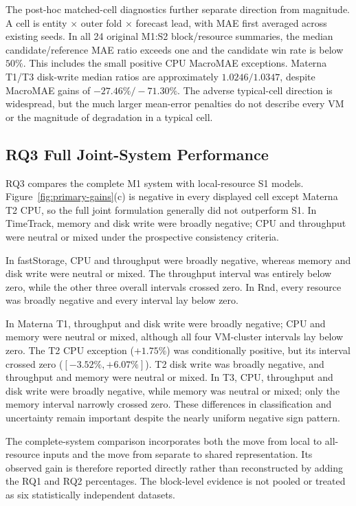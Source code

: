 \documentclass[a4paper,fleqn]{cas-dc}
\begin{document}
The post-hoc matched-cell diagnostics further separate direction from
magnitude. A cell is entity $\times$ outer fold $\times$ forecast lead, with
MAE first averaged across existing seeds. In all 24 original M1:S2
block/resource summaries, the median candidate/reference MAE ratio exceeds
one and the candidate win rate is below $50\%$. This includes the small
positive CPU MacroMAE exceptions. Materna T1/T3 disk-write median ratios are
approximately $1.0246/1.0347$, despite MacroMAE gains of
$-27.46\%/-71.30\%$. The adverse typical-cell direction is widespread, but
the much larger mean-error penalties do not describe every VM or the
magnitude of degradation in a typical cell.



\subsection{RQ3 Full Joint-System Performance}
\label{sec:results-rq3}

RQ3 compares the complete M1 system with local-resource S1 models.
Figure~\ref{fig:primary-gains}(c) is negative in every displayed cell except
Materna T2 CPU, so the full joint formulation generally did not outperform S1.
In TimeTrack, memory and disk write were broadly negative; CPU and throughput
were neutral or mixed under the prospective consistency criteria.

In fastStorage, CPU and throughput were broadly negative, whereas memory and
disk write were neutral or mixed. The throughput interval was entirely below
zero, while the other three overall intervals crossed zero. In Rnd, every
resource was broadly negative and every interval lay below zero.

In Materna T1, throughput and disk write were broadly negative; CPU and memory
were neutral or mixed, although all four VM-cluster intervals lay below zero.
The T2 CPU exception ($+1.75\%$) was conditionally positive, but its interval
crossed zero ($[-3.52\%,+6.07\%]$). T2 disk write was broadly negative, and
throughput and memory were neutral or mixed. In T3, CPU, throughput and disk
write were broadly negative, while memory was neutral or mixed; only the
memory interval narrowly crossed zero. These differences in classification
and uncertainty remain important despite the nearly uniform negative sign
pattern.

The complete-system comparison incorporates both the move from local to
all-resource inputs and the move from separate to shared representation. Its
observed gain is therefore reported directly rather than reconstructed by
adding the RQ1 and RQ2 percentages. The block-level evidence is not pooled or
treated as six statistically independent datasets.
\end{document}
